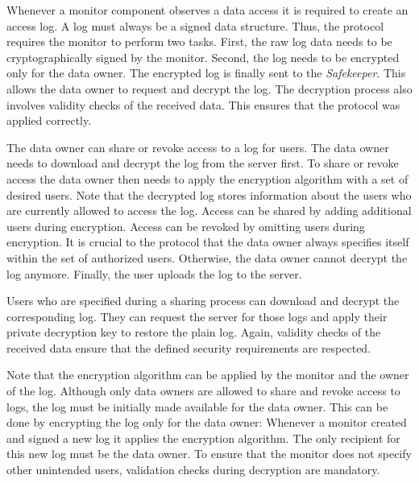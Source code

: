 \documentclass[../main.tex]{subfiles}
\begin{document}
Whenever a monitor component observes a data access it is required to create an access log.
A log must always be a signed data structure.
Thus, the protocol requires the monitor to perform two tasks.
First, the raw log data needs to be cryptographically signed by the monitor.
Second, the log needs to be encrypted only for the data owner.
The encrypted log is finally sent to the \emph{Safekeeper}.
This allows the data owner to request and decrypt the log.
The decryption process also involves validity checks of the received data.
This ensures that the protocol was applied correctly.

The data owner can share or revoke access to a log for users.
The data owner needs to download and decrypt the log from the server first.
To share or revoke access the data owner then needs to apply the encryption algorithm with a set of desired users.
Note that the decrypted log stores information about the users who are currently allowed to access the log.
Access can be shared by adding additional users during encryption.
Access can be revoked by omitting users during encryption.
It is crucial to the protocol that the data owner always specifies itself within the set of authorized users.
Otherwise, the data owner cannot decrypt the log anymore.
Finally, the user uploads the log to the server.

Users who are specified during a sharing process can download and decrypt the corresponding log.
They can request the server for those logs and apply their private decryption key to restore the plain log.
Again, validity checks of the received data ensure that the defined security requirements are respected.


Note that the encryption algorithm can be applied by the monitor and the owner of the log.
Although only data owners are allowed to share and revoke access to logs, the log must be initially made available for the data owner.
This can be done by encrypting the log only for the data owner:
Whenever a monitor created and signed a new log it applies the encryption algorithm.
The only recipient for this new log must be the data owner.
To ensure that the monitor does not specify other unintended users, validation checks during decryption are mandatory.
\end{document}
